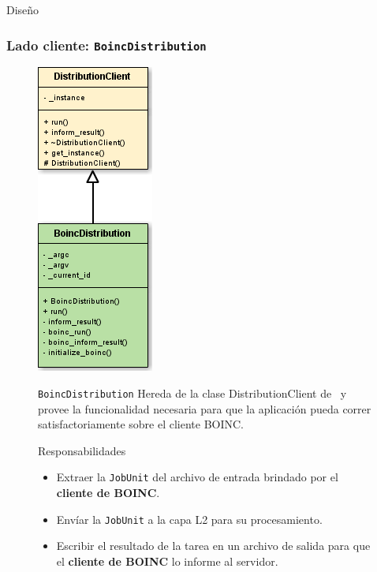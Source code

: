 \begin{subsection}{Diseño}
	\begin{frame}\frametitle{Lado cliente: \texttt{BoincDistribution}}
  		\begin{figure} 		
    		\begin{minipage}{0.2\linewidth}
      			\includegraphics[scale=0.5]{images/BoincDistribution.png}
    		\end{minipage}
    		\hfill
    		\begin{minipage}{0.7\linewidth}
      			\begin{block}{\texttt{BoincDistribution}}
      				Hereda de la clase DistributionClient de \fud \ y provee la funcionalidad necesaria para que la aplicación pueda correr 					satisfactoriamente sobre el cliente BOINC.
      			\end{block}
				\vspace{2mm}
      			\begin{block}{Responsabilidades}
      				\begin{itemize}
      					\item Extraer la \texttt{JobUnit} del archivo de entrada brindado por el \textbf{cliente de BOINC}.
						\item Envíar la \texttt{JobUnit} a la capa L2 para su procesamiento.
						\item Escribir el resultado de la tarea en un archivo de salida para que el \textbf{cliente de BOINC} 
						lo informe al servidor.
					\end{itemize}
      			\end{block}	
      		\end{minipage}
    	\end{figure}
	\end{frame}

\end{subsection}


